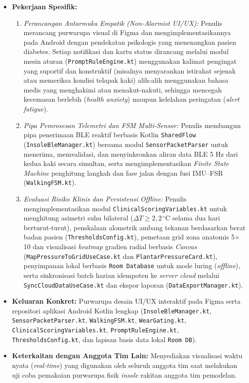 \begin{itemize}
    \item \textbf{Pekerjaan Spesifik:}
    \begin{enumerate}
        \item \textit{Perancangan Antarmuka Empatik (Non-Alarmist UI/UX):} Penulis merancang purwarupa visual di Figma dan mengimplementasikannya pada Android dengan pendekatan psikologis yang menenangkan pasien diabetes. Setiap notifikasi dan kartu status dirancang melalui modul mesin aturan (\texttt{PromptRuleEngine.kt}) menggunakan kalimat pengingat yang suportif dan konstruktif (misalnya menyarankan istirahat sejenak atau memeriksa kondisi telapak kaki) alih-alih menggunakan bahasa medis yang menghakimi atau menakut-nakuti, sehingga mencegah kecemasan berlebih (\textit{health anxiety}) maupun kelelahan peringatan (\textit{alert fatigue}).
        \item \textit{Pipa Pemrosesan Telemetri dan FSM Multi-Sensor:} Penulis membangun pipa penerimaan BLE reaktif berbasis Kotlin \texttt{SharedFlow} (\texttt{InsoleBleManager.kt}) bersama modul \texttt{SensorPacketParser} untuk menerima, memvalidasi, dan menyinkronkan aliran data BLE 5 Hz dari kedua kaki secara simultan, serta mengimplementasikan \textit{Finite State Machine} penghitung langkah dan fase jalan dengan fusi IMU--FSR (\texttt{WalkingFSM.kt}).
        \item \textit{Evaluasi Risiko Klinis dan Persistensi Offline:} Penulis mengimplementasikan modul \texttt{ClinicalScoringVariables.kt} untuk menghitung asimetri suhu bilateral ($\Delta T \ge 2{,}2\,^\circ\mathrm{C}$ selama dua hari berturut-turut), penskalaan alometrik ambang tekanan berdasarkan berat badan pasien (\texttt{ThresholdsConfig.kt}), pemetaan grid zona anatomis 5$\times$10 dan visualisasi \textit{heatmap} gradien radial berbasis \textit{Canvas} (\texttt{MapPressureToGridUseCase.kt} dan \texttt{PlantarPressureCard.kt}), penyimpanan lokal berbasis \texttt{Room Database} untuk mode luring (\textit{offline}), serta sinkronisasi batch harian idempoten ke \textit{server cloud} melalui \texttt{SyncCloudDataUseCase.kt} dan ekspor laporan (\texttt{DataExportManager.kt}).
    \end{enumerate}
    \item \textbf{Keluaran Konkret:} Purwarupa desain UI/UX interaktif pada Figma serta repositori aplikasi Android Kotlin lengkap (\texttt{InsoleBleManager.kt}, \texttt{SensorPacketParser.kt}, \texttt{WalkingFSM.kt}, \texttt{WearGating.kt}, \texttt{ClinicalScoringVariables.kt}, \texttt{PromptRuleEngine.kt}, \texttt{ThresholdsConfig.kt}, dan lapisan basis data lokal \texttt{Room DB}).
    \item \textbf{Keterkaitan dengan Anggota Tim Lain:} Menyediakan visualisasi waktu nyata (\textit{real-time}) yang digunakan oleh seluruh anggota tim saat melakukan uji coba pemakaian purwarupa fisik \textit{insole} rakitan anggota tim pemodelan.
\end{itemize}

